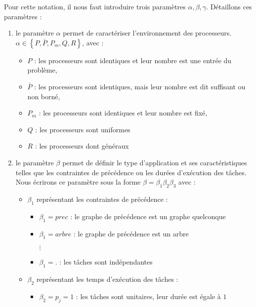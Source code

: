 Pour cette notation, il nous faut introduire trois paramètres $\alpha, \beta, \gamma$. Détaillons
ces paramètres :
\begin{enumerate}
    \item le paramètre $\alpha$ permet de caractériser l'environnement des processeurs. \\
        $\alpha \in \left\{ P, \bar{P}, P_m, Q, R \right\}$, avec :
        \begin{itemize}
            \item $P$ : les processeurs sont identiques et leur nombre est une entrée du problème,
            \item $\bar{P}$ : les processeurs sont identiques, mais leur nombre est dit suffisant ou
                non borné,
            \item $P_m$ : les processeurs sont identiques et leur nombre est fixé,
            \item $Q$ : les processeurs sont uniformes
            \item $R$ : les processeurs dont généraux
        \end{itemize}
    \item le paramètre $\beta$ permet de définir le type d'application et ses caractéristiques
        telles que les contraintes de précédence ou les durées d'exécution des tâches. Nous écrirons
        ce paramètre sous la forme $\beta = \beta_1\beta_2\beta_3$ avec :
        \begin{itemize}[label=$\bullet$]
            \item $\beta_1$ représentant les contraintes de précédence :
                \begin{itemize}
                    \item $\beta_1 = prec$ : le graphe de précédence est un graphe quelconque
                    \item $\beta_1 = arbre$ : le graphe de précédence est un arbre
                    \item[$\vdots$]
                    \item $\beta_1 = .$ : les tâches sont indépendantes
                \end{itemize}
            \item $\beta_2$ représentant les temps d'exécution des tâches :
                \begin{itemize}
                    \item $\beta_2 = p_j = 1$ : les tâches sont unitaires, leur durée est égale à
                        $1$

\end{itemize}
\end{itemize}
\end{enumerate}
